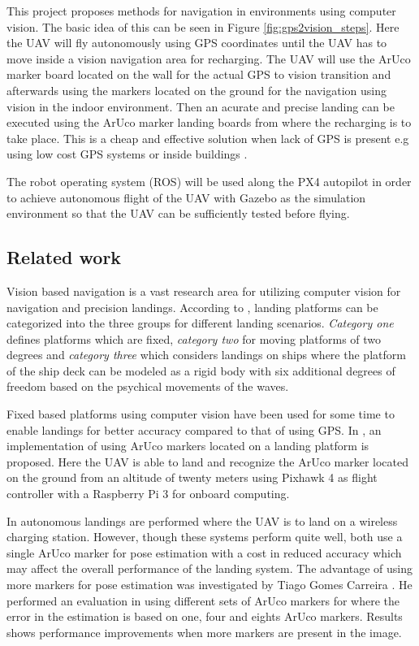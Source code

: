 \documentclass[../Head/report.tex]{subfiles}
\begin{document}
This project proposes methods for navigation in environments using computer vision. The basic idea of this can be seen in Figure \ref{fig:gps2vision_steps}. Here the UAV will fly autonomously using GPS coordinates until the UAV has to move inside a vision navigation area for recharging. The UAV will use the ArUco marker board located on the wall for the actual GPS to vision transition and afterwards using the markers located on the ground for the navigation using vision in the indoor environment. Then an acurate and precise landing can be executed using the ArUco marker landing boards from where the recharging is to take place. This is a cheap and effective solution when lack of GPS is present e.g using low cost GPS systems or inside buildings \cite{Visual-Inertial-Navigation}. 

The robot operating system (ROS) will be used along the PX4 autopilot in order to achieve autonomous flight of the UAV with Gazebo as the simulation environment so that the UAV can be sufficiently tested before flying. 

\subsection{Related work}
\label{sec:related_work}

Vision based navigation is a vast research area for utilizing computer vision for navigation and precision landings. According to \cite{OnBoardVisionAutonomousLanding}, landing platforms can be categorized into the three groups for different landing scenarios. \textit{Category one} defines platforms which are fixed, \textit{category two} for moving platforms of two degrees and \textit{category three} which considers landings on ships where the platform of the ship deck can be modeled as a rigid body with six additional degrees of freedom based on the psychical movements of the waves. 

Fixed based platforms using computer vision have been used for some time to enable landings for better accuracy compared to that of using GPS. In \cite{AVisionBasedSystemForAutonomousVerticaLanding}, an implementation of using ArUco markers located on a landing platform is proposed. Here the UAV is able to land and recognize the ArUco marker located on the ground from an altitude of twenty meters using Pixhawk 4 as flight controller with a Raspberry Pi 3 for onboard computing. 

In \cite{AutonomousRechargingSystemforDronesOne} \cite{AutonomousRechargingSystemforDronesTwo} autonomous landings are performed where the UAV is to land on a wireless charging station. However, though these systems perform quite well, both use a single ArUco marker for pose estimation with a cost in reduced accuracy which may affect the overall performance of the landing system. The advantage of using more markers for pose estimation was investigated by Tiago Gomes Carreira \cite{QuadcopterAutomaticLandingOnaDockingStation}. He performed an evaluation in using different sets of ArUco markers for where the error in the estimation is based on one, four and eights ArUco markers. Results shows performance improvements when more markers are present in the image. 
\end{document}
